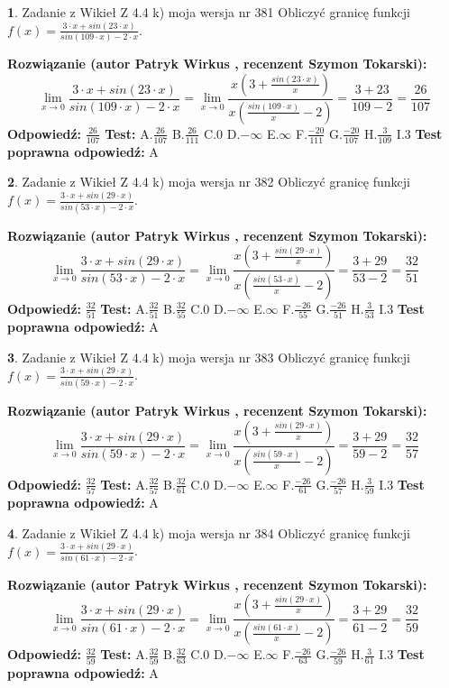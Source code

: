 \documentclass[12pt, a4paper]{article}
\theoremstyle{definition} %
\newtheorem{zad}{}
\newcommand{\zadStart}[1]{\begin{zad}#1\newline}
\newcommand{\zadStop}{\end{zad}}
\newcommand{\rozwStart}[2]{\noindent \textbf{Rozwiązanie (autor #1 , recenzent #2): }\newline}
\newcommand{\rozwStop}{\newline}
\newcommand{\odpStart}{\noindent \textbf{Odpowiedź:}\newline}
\newcommand{\odpStop}{\newline}
\newcommand{\testStart}{\noindent \textbf{Test:}\newline}
\newcommand{\testStop}{\newline}
\newcommand{\kluczStart}{\noindent \textbf{Test poprawna odpowiedź:}\newline}
\newcommand{\kluczStop}{\newline}
\begin{document}
\zadStart{Zadanie z Wikieł Z 4.4 k) moja wersja nr 381}
Obliczyć granicę funkcji $f(x)=\frac{3\cdot x +sin(23\cdot x)}{sin(109\cdot x) -2\cdot x}$.
\zadStop
\rozwStart{Patryk Wirkus}{Szymon Tokarski}
$$\lim\limits_{x\to 0}\frac{3\cdot x +sin(23\cdot x)}{sin(109\cdot x) -2\cdot x}
=\lim\limits_{x\to 0}\frac{x(3+\frac{sin(23\cdot x)}{x})}{x(\frac{sin(109\cdot x)}{x}-2)}
=\frac{3+23}{109-2} = \frac{26}{107}$$
\rozwStop
\odpStart
$\frac{26}{107}$
\odpStop
\testStart
A.$\frac{26}{107}$
B.$\frac{26}{111}$
C.$0$
D.$-\infty$
E.$\infty$
F.$\frac{-20}{111}$
G.$\frac{-20}{107}$
H.$\frac{3}{109}$
I.$3$
\testStop
\kluczStart
A
\kluczStop



\zadStart{Zadanie z Wikieł Z 4.4 k) moja wersja nr 382}
Obliczyć granicę funkcji $f(x)=\frac{3\cdot x +sin(29\cdot x)}{sin(53\cdot x) -2\cdot x}$.
\zadStop
\rozwStart{Patryk Wirkus}{Szymon Tokarski}
$$\lim\limits_{x\to 0}\frac{3\cdot x +sin(29\cdot x)}{sin(53\cdot x) -2\cdot x}
=\lim\limits_{x\to 0}\frac{x(3+\frac{sin(29\cdot x)}{x})}{x(\frac{sin(53\cdot x)}{x}-2)}
=\frac{3+29}{53-2} = \frac{32}{51}$$
\rozwStop
\odpStart
$\frac{32}{51}$
\odpStop
\testStart
A.$\frac{32}{51}$
B.$\frac{32}{55}$
C.$0$
D.$-\infty$
E.$\infty$
F.$\frac{-26}{55}$
G.$\frac{-26}{51}$
H.$\frac{3}{53}$
I.$3$
\testStop
\kluczStart
A
\kluczStop



\zadStart{Zadanie z Wikieł Z 4.4 k) moja wersja nr 383}
Obliczyć granicę funkcji $f(x)=\frac{3\cdot x +sin(29\cdot x)}{sin(59\cdot x) -2\cdot x}$.
\zadStop
\rozwStart{Patryk Wirkus}{Szymon Tokarski}
$$\lim\limits_{x\to 0}\frac{3\cdot x +sin(29\cdot x)}{sin(59\cdot x) -2\cdot x}
=\lim\limits_{x\to 0}\frac{x(3+\frac{sin(29\cdot x)}{x})}{x(\frac{sin(59\cdot x)}{x}-2)}
=\frac{3+29}{59-2} = \frac{32}{57}$$
\rozwStop
\odpStart
$\frac{32}{57}$
\odpStop
\testStart
A.$\frac{32}{57}$
B.$\frac{32}{61}$
C.$0$
D.$-\infty$
E.$\infty$
F.$\frac{-26}{61}$
G.$\frac{-26}{57}$
H.$\frac{3}{59}$
I.$3$
\testStop
\kluczStart
A
\kluczStop



\zadStart{Zadanie z Wikieł Z 4.4 k) moja wersja nr 384}
Obliczyć granicę funkcji $f(x)=\frac{3\cdot x +sin(29\cdot x)}{sin(61\cdot x) -2\cdot x}$.
\zadStop
\rozwStart{Patryk Wirkus}{Szymon Tokarski}
$$\lim\limits_{x\to 0}\frac{3\cdot x +sin(29\cdot x)}{sin(61\cdot x) -2\cdot x}
=\lim\limits_{x\to 0}\frac{x(3+\frac{sin(29\cdot x)}{x})}{x(\frac{sin(61\cdot x)}{x}-2)}
=\frac{3+29}{61-2} = \frac{32}{59}$$
\rozwStop
\odpStart
$\frac{32}{59}$
\odpStop
\testStart
A.$\frac{32}{59}$
B.$\frac{32}{63}$
C.$0$
D.$-\infty$
E.$\infty$
F.$\frac{-26}{63}$
G.$\frac{-26}{59}$
H.$\frac{3}{61}$
I.$3$
\testStop
\kluczStart
A
\kluczStop
\end{document}
